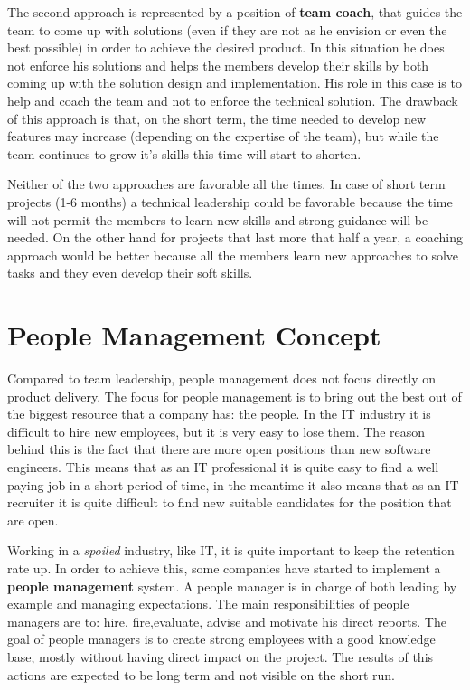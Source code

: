 The second approach is represented by a position of \textbf{team coach}, that guides the team to come up with solutions (even if they are not as he envision or even the best possible) in order to achieve the desired product. In this situation he does not enforce his solutions and helps the members develop their skills by both coming up with the solution design and implementation. His role in this case is to help and coach the team and not to enforce the technical solution. The drawback of this approach is that, on the short term, the time needed to develop new features may increase (depending on the expertise of the team), but while the team continues to grow it's skills this time will start to shorten.

Neither of the two approaches are favorable all the times. In case of short term projects (1-6 months) a technical leadership could be favorable because the time will not permit the members to learn new skills and strong guidance will be needed. On the other hand for projects that last more that half a year, a coaching approach would be better because all the members learn new approaches to solve tasks and they even develop their soft skills.

\section{People Management Concept}
\label{sec:proj-scope}
Compared to team leadership, people management does not focus directly on product delivery. The focus for people management is to bring out the best out of the biggest resource that a company has: the people. In the IT industry it is difficult to hire new employees, but it is very easy to lose them. The reason behind this is the fact that there are more open positions than new software engineers. This means that as an IT professional it is quite easy to find a well paying job in a short period of time, in the meantime it also means that as an IT recruiter it is quite difficult to find new suitable candidates for the position that are open. 

Working in a \textit{spoiled} industry, like IT, it is quite important to keep the retention rate up.  In order to achieve this, some companies have started to implement a \textbf{people management} system. A people manager is in charge of both leading by example and managing expectations. The main responsibilities of people managers are to: hire, fire,evaluate, advise and motivate his direct reports. The goal of people managers is to create strong employees with a good knowledge base, mostly without having direct impact on the project. The results of this actions are expected to be long term and not visible on the short run. 

